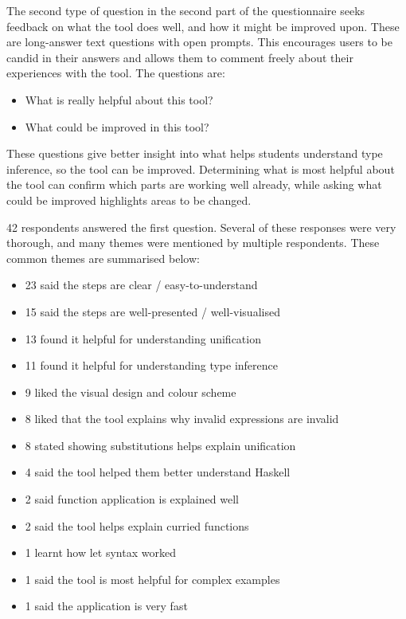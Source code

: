 \documentclass[a4paper,fleqn,oneside,12pt]{report}
\begin{document}
The second type of question in the second part of the questionnaire seeks feedback on what the tool does well, and how it might be improved upon. These are long-answer text questions with open prompts. This encourages users to be candid in their answers and allows them to comment freely about their experiences with the tool. The questions are:
\begin{itemize}
  \item What is really helpful about this tool?
  \item What could be improved in this tool?
\end{itemize}

These questions give better insight into what helps students understand type inference, so the tool can be improved. Determining what is most helpful about the tool can confirm which parts are working well already, while asking what could be improved highlights areas to be changed.

42 respondents answered the first question. Several of these responses were very thorough, and many themes were mentioned by multiple respondents. These common themes are summarised below:
\begin{itemize}
  \item 23 said the steps are clear / easy-to-understand
  \item 15 said the steps are well-presented / well-visualised
  \item 13 found it helpful for understanding unification
  \item 11 found it helpful for understanding type inference
  \item 9 liked the visual design and colour scheme
  \item 8 liked that the tool explains why invalid expressions are invalid
  \item 8 stated showing substitutions helps explain unification
  \item 4 said the tool helped them better understand Haskell
  \item 2 said function application is explained well
  \item 2 said the tool helps explain curried functions
  \item 1 learnt how let syntax worked
  \item 1 said the tool is most helpful for complex examples
  \item 1 said the application is very fast
\end{itemize}
\end{document}
